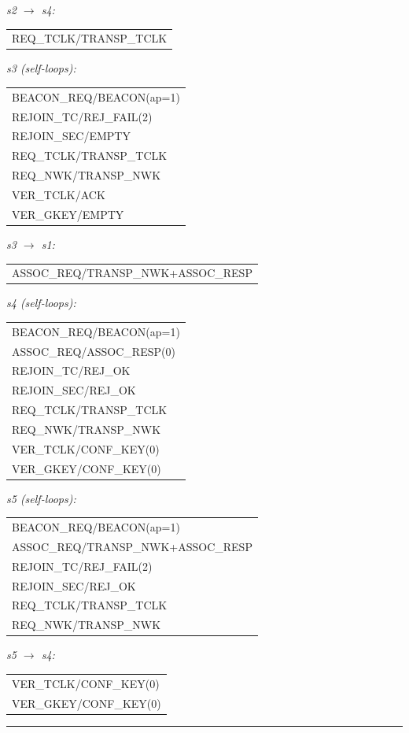 \documentclass[10pt]{article}
\makeatletter
\newcommand{\iolist}[1]{%
  \ttfamily\small
  \begin{tabular}{@{}l@{}}
  #1
  \end{tabular}%
  \rmfamily
}
\makeatother
\begin{document}
\medskip
\noindent\textit{s2 $\to$ s4:}\\[2pt]
\iolist{%
REQ\_TCLK/TRANSP\_TCLK\\
}

\medskip
\noindent\textit{s3 (self-loops):}\\[2pt]
\iolist{%
BEACON\_REQ/BEACON(ap=1)\\
REJOIN\_TC/REJ\_FAIL(2)\\
REJOIN\_SEC/EMPTY\\
REQ\_TCLK/TRANSP\_TCLK\\
REQ\_NWK/TRANSP\_NWK\\
VER\_TCLK/ACK\\
VER\_GKEY/EMPTY\\
}

\medskip
\noindent\textit{s3 $\to$ s1:}\\[2pt]
\iolist{%
ASSOC\_REQ/TRANSP\_NWK+ASSOC\_RESP\\
}

\medskip
\noindent\textit{s4 (self-loops):}\\[2pt]
\iolist{%
BEACON\_REQ/BEACON(ap=1)\\
ASSOC\_REQ/ASSOC\_RESP(0)\\
REJOIN\_TC/REJ\_OK\\
REJOIN\_SEC/REJ\_OK\\
REQ\_TCLK/TRANSP\_TCLK\\
REQ\_NWK/TRANSP\_NWK\\
VER\_TCLK/CONF\_KEY(0)\\
VER\_GKEY/CONF\_KEY(0)\\
}

\medskip
\noindent\textit{s5 (self-loops):}\\[2pt]
\iolist{%
BEACON\_REQ/BEACON(ap=1)\\
ASSOC\_REQ/TRANSP\_NWK+ASSOC\_RESP\\
REJOIN\_TC/REJ\_FAIL(2)\\
REJOIN\_SEC/REJ\_OK\\
REQ\_TCLK/TRANSP\_TCLK\\
REQ\_NWK/TRANSP\_NWK\\
}

\medskip
\noindent\textit{s5 $\to$ s4:}\\[2pt]
\iolist{%
VER\_TCLK/CONF\_KEY(0)\\
VER\_GKEY/CONF\_KEY(0)\\
}

\bigskip\hrule

\end{document}
